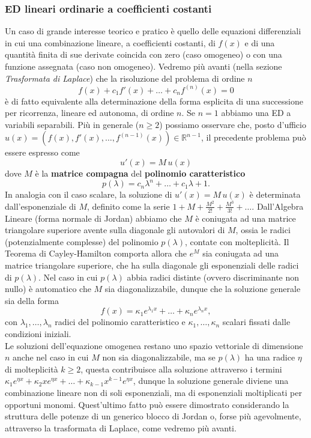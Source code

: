 \documentclass[a4paper,twoside]{article}
\newcommand{\R}{\mathbb{R}}
\theoremstyle{definition}
\numberwithin{theorem}{section}
\begin{document}
\subsubsection{ED lineari ordinarie a coefficienti costanti}
Un caso di grande interesse teorico e pratico è quello delle equazioni differenziali in cui una combinazione lineare, a coefficienti costanti, di $f(x)$ e di una quantità finita di sue derivate coincida con zero (caso omogeneo) o con una funzione assegnata (caso non omogeneo). Vedremo più avanti (nella sezione \emph{Trasformata di Laplace}) che la risoluzione del problema di ordine $n$
$$ f(x) + c_1 f'(x) + \ldots + c_n f^{(n)}(x) = 0$$
è di fatto equivalente alla determinazione della forma esplicita di una successione per ricorrenza, lineare ed autonoma, di ordine $n$. Se $n=1$ abbiamo una ED a variabili separabili. Più in generale ($n\geq 2$) possiamo osservare che, posto d'ufficio $u(x)=\left(f(x),f'(x),\ldots,f^{(n-1)}(x)\right)\in\R^{n-1}$, il precedente problema può essere espresso come 
$$ u'(x) = M\,u(x) $$
dove $M$ è la \textbf{matrice compagna} del \textbf{polinomio caratteristico}
$$ p(\lambda) = c_n \lambda^n + \ldots + c_1 \lambda + 1. $$
In analogia con il caso scalare, la soluzione di $u'(x)=M\,u(x)$ è determinata dall'esponenziale di $M$, definito come la serie $1+M+\frac{M^2}{2!}+\frac{M^3}{3!}+\ldots$. Dall'Algebra Lineare (forma normale di Jordan) abbiamo che $M$ è coniugata ad una matrice triangolare superiore avente sulla diagonale gli autovalori di $M$, ossia le radici (potenzialmente complesse) del polinomio $p(\lambda)$, contate con molteplicità. Il Teorema di Cayley-Hamilton comporta allora che $e^M$ sia coniugata ad una matrice triangolare superiore, che ha sulla diagonale gli esponenziali delle radici di $p(\lambda)$. Nel caso in cui $p(\lambda)$ abbia radici distinte (ovvero discriminante non nullo) è automatico che $M$ sia diagonalizzabile, dunque che la soluzione generale sia della forma 
$$ f(x) = \kappa_1 e^{\lambda_1 x}+\ldots+\kappa_n e^{\lambda_n x}, $$
con $\lambda_1,\ldots,\lambda_n$ radici del polinomio caratteristico e $\kappa_1,\ldots,\kappa_n$ scalari fissati dalle condizioni iniziali.\\
Le soluzioni dell'equazione omogenea restano uno spazio vettoriale di dimensione $n$ anche nel caso in cui $M$ non sia diagonalizzabile, ma se $p(\lambda)$ ha una radice $\eta$ di molteplicità $k\geq 2$, questa contribuisce alla soluzione attraverso i termini $\kappa_1 e^{\eta x}+\kappa_2 x e^{\eta x}+\ldots+\kappa_{k-1} x^{k-1} e^{\eta x}$, dunque la soluzione generale diviene una combinazione lineare non di soli esponenziali, ma di esponenziali moltiplicati per opportuni monomi. Quest'ultimo fatto può essere dimostrato considerando la struttura delle potenze di un generico blocco di Jordan o, forse più agevolmente, attraverso la trasformata di Laplace, come vedremo più avanti.
\end{document}
